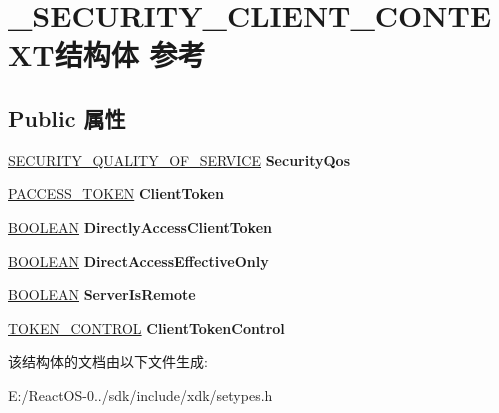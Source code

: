 \hypertarget{struct___s_e_c_u_r_i_t_y___c_l_i_e_n_t___c_o_n_t_e_x_t}{}\section{\+\_\+\+S\+E\+C\+U\+R\+I\+T\+Y\+\_\+\+C\+L\+I\+E\+N\+T\+\_\+\+C\+O\+N\+T\+E\+X\+T结构体 参考}
\label{struct___s_e_c_u_r_i_t_y___c_l_i_e_n_t___c_o_n_t_e_x_t}
\subsection*{Public 属性}
\begin{DoxyCompactItemize}
\item 
\mbox{\label{struct___s_e_c_u_r_i_t_y___c_l_i_e_n_t___c_o_n_t_e_x_t_a7033755608d543bfac4614aa0f59b3bf}} 
\hyperlink{struct___s_e_c_u_r_i_t_y___q_u_a_l_i_t_y___o_f___s_e_r_v_i_c_e}{S\+E\+C\+U\+R\+I\+T\+Y\+\_\+\+Q\+U\+A\+L\+I\+T\+Y\+\_\+\+O\+F\+\_\+\+S\+E\+R\+V\+I\+CE} {\bfseries Security\+Qos}
\item 
\mbox{\label{struct___s_e_c_u_r_i_t_y___c_l_i_e_n_t___c_o_n_t_e_x_t_a62d1ba511c663eeb9103c27799ee8076}} 
\hyperlink{interfacevoid}{P\+A\+C\+C\+E\+S\+S\+\_\+\+T\+O\+K\+EN} {\bfseries Client\+Token}
\item 
\mbox{\label{struct___s_e_c_u_r_i_t_y___c_l_i_e_n_t___c_o_n_t_e_x_t_a82c7e03cf0e123d03e21c18c02127227}} 
\hyperlink{_processor_bind_8h_a112e3146cb38b6ee95e64d85842e380a}{B\+O\+O\+L\+E\+AN} {\bfseries Directly\+Access\+Client\+Token}
\item 
\mbox{\label{struct___s_e_c_u_r_i_t_y___c_l_i_e_n_t___c_o_n_t_e_x_t_a8e4541fced51d1d57e0afeac4ff0cc18}} 
\hyperlink{_processor_bind_8h_a112e3146cb38b6ee95e64d85842e380a}{B\+O\+O\+L\+E\+AN} {\bfseries Direct\+Access\+Effective\+Only}
\item 
\mbox{\label{struct___s_e_c_u_r_i_t_y___c_l_i_e_n_t___c_o_n_t_e_x_t_a1f98048b0607a106f07f320fbc6f5a84}} 
\hyperlink{_processor_bind_8h_a112e3146cb38b6ee95e64d85842e380a}{B\+O\+O\+L\+E\+AN} {\bfseries Server\+Is\+Remote}
\item 
\mbox{\label{struct___s_e_c_u_r_i_t_y___c_l_i_e_n_t___c_o_n_t_e_x_t_a1d829675dad72e3bfbfcd4c48b37e38e}} 
\hyperlink{struct___t_o_k_e_n___c_o_n_t_r_o_l}{T\+O\+K\+E\+N\+\_\+\+C\+O\+N\+T\+R\+OL} {\bfseries Client\+Token\+Control}
\end{DoxyCompactItemize}


该结构体的文档由以下文件生成\+:\begin{DoxyCompactItemize}
\item 
E\+:/\+React\+O\+S-\/0../sdk/include/xdk/setypes.\+h\end{DoxyCompactItemize}
